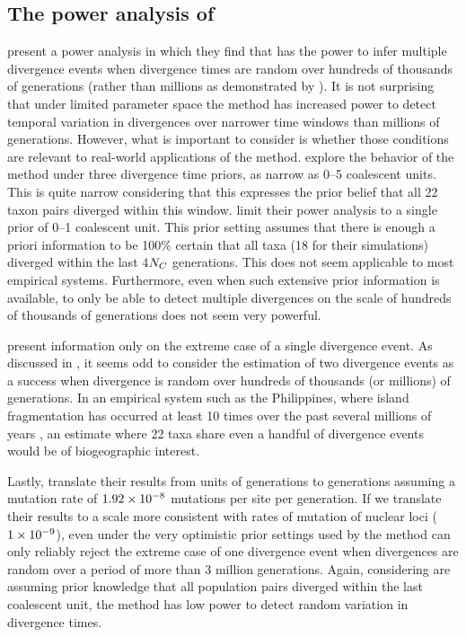 \documentclass[letterpaper,12pt]{article}
\begin{document}
\begin{linenumbers}
\section*{The power analysis of \citet{Hickerson2013}}
\citet{Hickerson2013} present a power analysis in which they find that
\msb has the power to infer multiple divergence events when divergence times
are random over hundreds of thousands of generations (rather than millions as
demonstrated by \citet{Oaks2012}).
It is not surprising that under limited parameter space the method has
increased power to detect temporal variation in divergences over narrower time
windows than millions of generations.
However, what is important to consider is whether those conditions are relevant
to real-world applications of the method.
\citet{Oaks2012} explore the behavior of the method under three divergence time
priors, as narrow as 0--5 coalescent units. This is quite narrow considering
that this expresses the prior belief that all 22 taxon pairs diverged within
this window.
\citet{Hickerson2013} limit their power analysis to a single prior of 0--1
coalescent unit.
This prior setting assumes that there is enough a priori information to
be 100\% certain that all taxa (18 for their simulations) diverged within
the last 4$N_C$ generations.
This does not seem applicable to most empirical systems.
Furthermore, even when such extensive prior information is available, to only
be able to detect multiple divergences on the scale of hundreds of thousands of
generations does not seem very powerful.

\citet{Hickerson2013} present information only on the extreme case of a
single divergence event.
As discussed in \citet{Oaks2012}, it seems odd to consider the estimation
of two divergence events as a success when divergence is random over hundreds
of thousands (or millions) of generations.
In an empirical system such as the Philippines, where island fragmentation has
occurred at least 10 times over the past several millions of years
\citep{Haq1987,Rohling1998,Siddall2003,Miller2005}, an estimate where 22 taxa
share even a handful of divergence events would be of biogeographic interest.

Lastly, \citet{Hickerson2013} translate their results from units of
\globalcoalunit generations to generations assuming a mutation rate of
$1.92\times 10^{-8}$ mutations per site per generation.
If we translate their results to a scale more consistent with rates of mutation
of nuclear loci ($1\times 10^{-9}$), even under the very optimistic prior settings used
by \citet{Hickerson2013} the method can only reliably reject the extreme case
of one divergence event when divergences are random over a period of more than
3 million generations.
Again, considering \citet{Hickerson2013} are assuming prior knowledge that
all population pairs diverged within the last coalescent unit, the
method has low power to detect random variation in divergence times.





\end{linenumbers}
\end{document}
